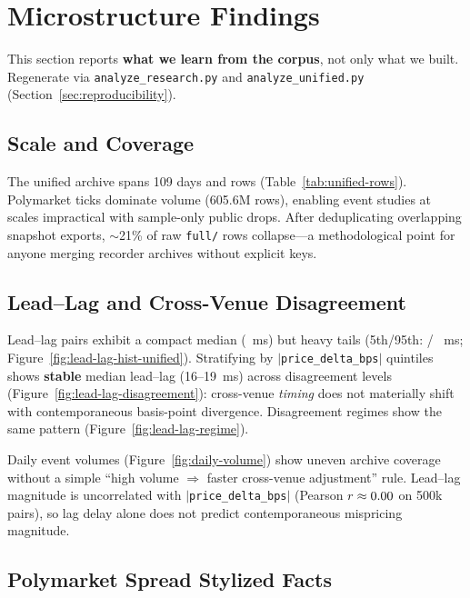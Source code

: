 \section{Microstructure Findings}
\label{sec:insights}

This section reports \textbf{what we learn from the corpus}, not only what we
built. Regenerate via \texttt{analyze\_research.py} and
\texttt{analyze\_unified.py} (Section~\ref{sec:reproducibility}).

\subsection{Scale and Coverage}
\label{sec:insights-scale}

The unified archive spans 109 days and \OpenMarketTotalRows{} rows
(Table~\ref{tab:unified-rows}). Polymarket ticks dominate volume
(605.6M rows), enabling event studies at scales impractical with sample-only
public drops. After deduplicating overlapping snapshot exports, ${\sim}$21\% of
raw \texttt{full/} rows collapse---a methodological point for anyone merging
recorder archives without explicit keys.

\subsection{Lead--Lag and Cross-Venue Disagreement}
\label{sec:insights-leadlag}

Lead--lag pairs exhibit a compact median (\OpenMarketLagMedian{}~ms) but heavy
tails (5th/95th: \OpenMarketLagPFive{} / \OpenMarketLagPNinetyFive{}~ms;
Figure~\ref{fig:lead-lag-hist-unified}). Stratifying by $|$\texttt{price\_delta\_bps}$|$
quintiles shows \textbf{stable} median lead--lag (16--19~ms) across disagreement
levels (Figure~\ref{fig:lead-lag-disagreement}): cross-venue \emph{timing} does
not materially shift with contemporaneous basis-point divergence.
Disagreement regimes show the same pattern (Figure~\ref{fig:lead-lag-regime}).

Daily event volumes (Figure~\ref{fig:daily-volume}) show uneven archive
coverage without a simple ``high volume $\Rightarrow$ faster cross-venue
adjustment'' rule.
Lead--lag magnitude is uncorrelated with $|$\texttt{price\_delta\_bps}$|$
(Pearson $r \approx 0.00{}$ on 500k pairs), so lag delay alone does not predict
contemporaneous mispricing magnitude.

\subsection{Polymarket Spread Stylized Facts}
\label{sec:insights-spread}

